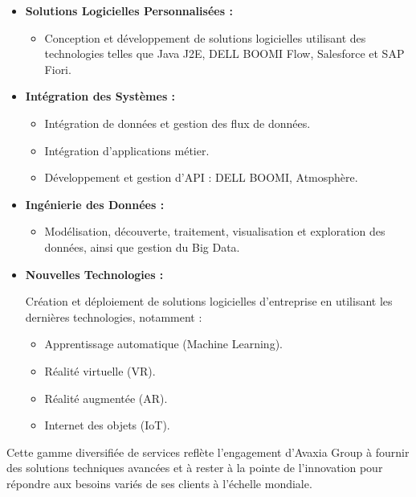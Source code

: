 \begin{itemize}
\begin{itemize}
            \end{itemize}
     \item \textbf{ Solutions Logicielles Personnalisées :}
            \begin{itemize}
                \item  Conception et développement de solutions logicielles utilisant des technologies telles que Java J2E, DELL BOOMI Flow, Salesforce et SAP Fiori.
            \end{itemize}
         \item \textbf{Intégration des Systèmes :}
            \begin{itemize}
                \item  Intégration de données et gestion des flux de données.
                \item Intégration d'applications métier.
                \item Développement et gestion d'API : DELL BOOMI, Atmosphère.
            \end{itemize}
    \item \textbf{Ingénierie des Données :}
            \begin{itemize}
                \item  Modélisation, découverte, traitement, visualisation et exploration des données, ainsi que gestion du Big Data.
            \end{itemize}
    \item \textbf{Nouvelles Technologies :}
            \par Création et déploiement de solutions logicielles d'entreprise en utilisant les dernières technologies, notamment :
            \begin{itemize}
                \item  Apprentissage automatique (Machine Learning).
                \item Réalité virtuelle (VR).
                \item Réalité augmentée (AR).
                \item Internet des objets (IoT).
            \end{itemize}
    
\end{itemize}
\par Cette gamme diversifiée de services reflète l'engagement d'Avaxia Group à fournir des solutions techniques avancées et à rester à la pointe de l'innovation pour répondre aux besoins variés de ses clients à l'échelle mondiale.


